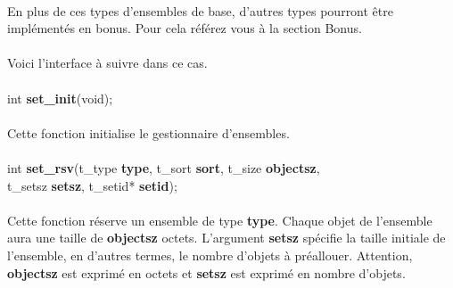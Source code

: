 \documentclass[10pt,a4wide]{article}
\begin{document}
\paragraph{}

En plus de ces types d'ensembles de base, d'autres types pourront
\^etre impl\'ement\'es en bonus. Pour cela r\'ef\'erez vous \`a la section
Bonus.

\paragraph{}

Voici l'interface \`a suivre dans ce cas.

\paragraph{}

\hspace{1.5cm}int \textbf{set\_init}(void);

\paragraph{}

Cette fonction initialise le gestionnaire d'ensembles.

\paragraph{}

\hspace{1.5cm}int \textbf{set\_rsv}(t\_type \textbf{type},
                                    t\_sort \textbf{sort},
                                    t\_size \textbf{objectsz}, \\
\bigskip
\hspace{3.6cm}                      t\_setsz \textbf{setsz},
                                    t\_setid* \textbf{setid});

\paragraph{}

Cette fonction r\'eserve un ensemble de type \textbf{type}. Chaque objet
de l'ensemble aura une taille de \textbf{objectsz} octets.
L'argument \textbf{setsz} sp\'ecifie la taille initiale de l'ensemble,
en d'autres termes, le nombre d'objets \`a pr\'eallouer. Attention,
\textbf{objectsz} est exprim\'e en octets et \textbf{setsz} est exprim\'e
en nombre d'objets.
\end{document}
